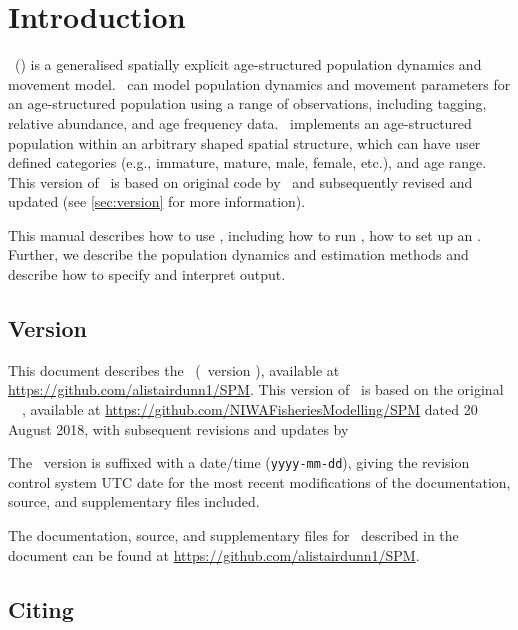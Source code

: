 \section{Introduction\label{sec:Introduction}}

\SPM\ (\SPMName) is a generalised spatially explicit age-structured population dynamics and movement model. \SPM\ can model population dynamics and movement parameters for an age-structured population using a range of observations, including tagging, relative abundance, and age frequency data. \SPM\ implements an age-structured population within an arbitrary shaped spatial structure, which can have user defined categories (e.g., immature, mature, male, female, etc.), and age range. This version of \SPM\ is based on original code by \NIWA\ and subsequently revised and updated (see \ref{sec:version} for more information). 

This manual describes how to use \SPM, including how to run \SPM, how to set up an \config. Further, we describe the population dynamics and estimation methods and describe how to specify and interpret output. 

\subsection{Version\label{sec:version}}

This document describes the \SPMName\ (\SPM\ version \VER{}), available at \href{https://github.com/alistairdunn1/SPM}{https://github.com/alistairdunn1/SPM}. This version of \SPM\ is based on the original \NIWA\ \SPM\ \citep{Dunn_Rasmussen_Mormede_2018}, available at \href{https://github.com/NIWAFisheriesModelling/SPM}{https://github.com/NIWAFisheriesModelling/SPM} dated 20 August 2018, with subsequent revisions and updates by \OceanEnv

The \SPM\ version is suffixed with a date/time (\texttt{yyyy-mm-dd}), giving the revision control system UTC date for the most recent modifications of the documentation, source, and supplementary files included.

The documentation, source, and supplementary files for \SPM\ described in the document can be found at \href{https://github.com/alistairdunn1/SPM}{https://github.com/alistairdunn1/SPM}.

\subsection{Citing \SPM}

